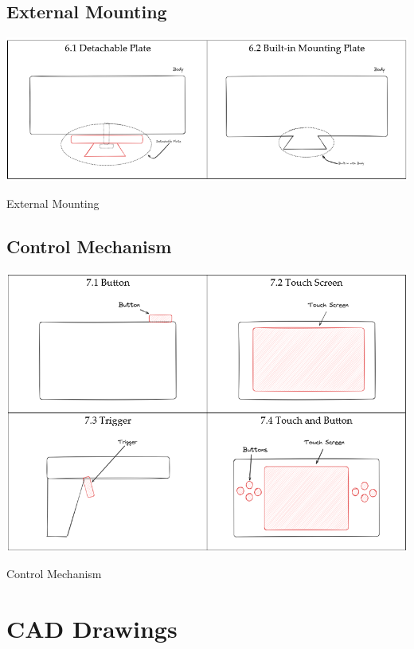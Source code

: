 \subsection{External Mounting}
\begin{table}[H]
    \centering
    \includegraphics[width=\linewidth]{texs/Part1/chapter3/image/s6.png}
    \caption{External Mounting}
    \label{tab:external-mounting}
\end{table}

\subsection{Control Mechanism}
\begin{table}[H]
    \centering
    \includegraphics[width=\linewidth]{texs/Part1/chapter3/image/s7.png}
    \caption{Control Mechanism}
    \label{tab:control-mechanism}
\end{table}

\section{CAD Drawings}
\label{appendix:cad-drawings}

